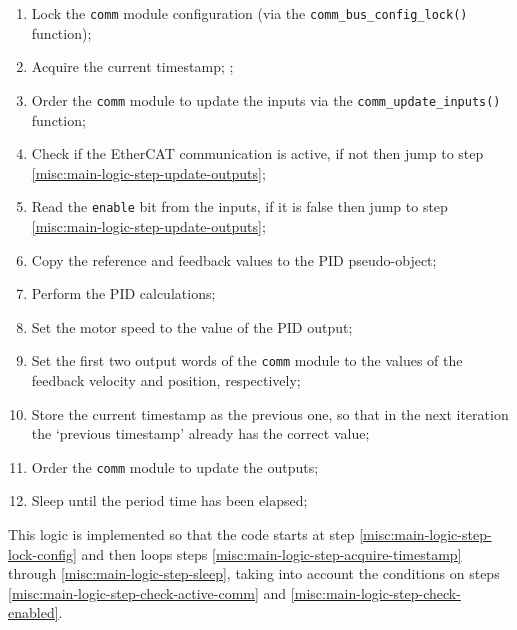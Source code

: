 \begin{enumerate}
	\item Lock the \verb|comm| module configuration (via the \lstinline[columns=fixed]{comm_bus_config_lock()} function); \label{misc:main-logic-step-lock-config}
	\item Acquire the current timestamp; \label{misc:main-logic-step-acquire-timestamp};
	\item Order the \verb|comm| module to update the inputs via the \lstinline[columns=fixed]{comm_update_inputs()} function;
	\item Check if the EtherCAT communication is active, if not then jump to step \ref{misc:main-logic-step-update-outputs}; \label{misc:main-logic-step-check-active-comm}
	\item Read the \verb|enable| bit from the inputs, if it is false then jump to step \ref{misc:main-logic-step-update-outputs}; \label{misc:main-logic-step-check-enabled}
	\item Copy the reference and feedback values to the PID pseudo-object;
	\item Perform the PID calculations;
	\item Set the motor speed to the value of the PID output;
	\item Set the first two output words of the \verb|comm| module to the values of the feedback velocity and position, respectively; \label{misc:main-logic-step-update-outputs}
	\item Store the current timestamp as the previous one, so that in the next iteration the `previous timestamp' already has the correct value;
	\item Order the \verb|comm| module to update the outputs;
	\item Sleep until the period time has been elapsed; \label{misc:main-logic-step-sleep}
\end{enumerate}

This logic is implemented so that the code starts at step \ref{misc:main-logic-step-lock-config} and then loops steps \ref{misc:main-logic-step-acquire-timestamp} through \ref{misc:main-logic-step-sleep}, taking into account the conditions on steps \ref{misc:main-logic-step-check-active-comm} and \ref{misc:main-logic-step-check-enabled}.

